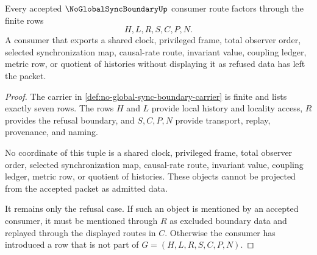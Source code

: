 \begin{theorem}
\label{thm:no-global-sync-boundary-finite-packet-nonescape}
Every accepted $\NoGlobalSyncBoundaryUp$ consumer route factors through the finite rows
$$
H,L,R,S,C,P,N.
$$
A consumer that exports a shared clock, privileged frame, total observer order, selected synchronization map, causal-rate route, invariant value, coupling ledger, metric row, or quotient of histories without displaying it as refused data has left the packet.
\end{theorem}
\begin{proof}
The carrier in \autoref{def:no-global-sync-boundary-carrier} is finite and lists exactly seven rows. The rows $H$ and $L$ provide local history and locality access, $R$ provides the refusal boundary, and $S,C,P,N$ provide transport, replay, provenance, and naming.

No coordinate of this tuple is a shared clock, privileged frame, total observer order, selected synchronization map, causal-rate route, invariant value, coupling ledger, metric row, or quotient of histories. These objects cannot be projected from the accepted packet as admitted data.

It remains only the refusal case. If such an object is mentioned by an accepted consumer, it must be mentioned through $R$ as excluded boundary data and replayed through the displayed routes in $C$. Otherwise the consumer has introduced a row that is not part of $G=(H,L,R,S,C,P,N)$.
\end{proof}

